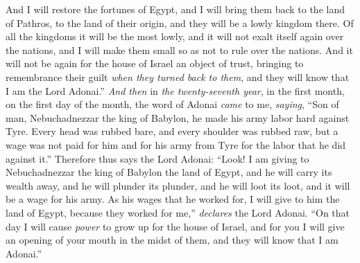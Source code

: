 \begin{biblechapter}
\verse And I will restore the fortunes of Egypt, and I will bring them back to the land of Pathros, to the land of their origin, and they will be a lowly kingdom there.
\verse Of all the kingdoms it will be the most lowly, and it will not exalt itself again over the nations, and I will make them small so as not to rule over the nations.
\verse And it will not be again for the house of Israel an object of trust, bringing to remembrance their guilt \textit{when they turned back to them}, and they will know that I am the Lord Adonai.”
\verse \textit{And then} in \textit{the twenty-seventh year}, in the first month, on the first day of the month, the word of Adonai \textit{came} to me, \textit{saying},
\verse “Son of man, Nebuchadnezzar the king of Babylon, he made his army labor hard against Tyre. Every head was rubbed bare, and every shoulder was rubbed raw, but a wage was not paid for him and for his army from Tyre for the labor that he did against it.”
\verse Therefore thus says the Lord Adonai: “Look! I am giving to Nebuchadnezzar the king of Babylon the land of Egypt, and he will carry its wealth away, and he will plunder its plunder, and he will loot its loot, and it will be a wage for his army.
\verse As his wages that he worked for, I will give to him the land of Egypt, because they worked for me,” \textit{declares} the Lord Adonai.
\verse “On that day I will cause \textit{power} to grow up for the house of Israel, and for you I will give an opening of your mouth in the midst of them, and they will know that I am Adonai.”
\end{biblechapter}

